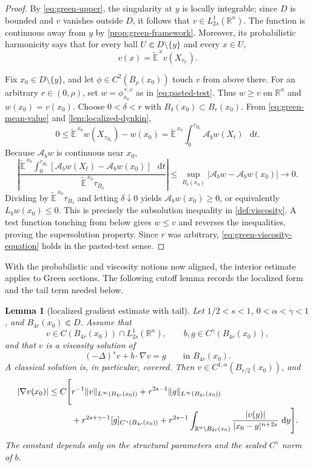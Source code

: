 \documentclass[10pt,a4paper]{amsart}
\numberwithin{equation}{section}
\newtheorem{lemma}[theorem]{Lemma}
\newcommand{\R}{\mathbb R}
\newcommand{\differential}{\mathop{}\!\mathrm d}
\newcommand{\rev}[1]{#1}
\begin{document}
\begin{proof}
By \eqref{eq:green-upper}, the singularity at $y$ is locally integrable;
since $D$ is bounded and $v$ vanishes outside $D$, it follows that
$v\in L^1_{2s}(\R^n)$.  The function is continuous away from $y$ by
\cref{prop:green-framework}.  Moreover, its probabilistic harmonicity says
that for every ball $U\Subset D\setminus\{y\}$ and every $x\in U$,
\begin{equation}\label{eq:green-mean-value}
 v(x)=\widetilde{\mathbb E}^{\,x}v(X_{\tau_U}).
\end{equation}

Fix $x_0\in D\setminus\{y\}$, and let $\phi\in C^2(B_\rho(x_0))$ touch
$v$ from above there.  For an arbitrary $r\in(0,\rho)$, set
$w=\phi^{\,r,v}_{x_0}$ as in \eqref{eq:pasted-test}.  Thus $w\ge v$ on
$\R^n$ and $w(x_0)=v(x_0)$.  Choose
$0<\delta<r$ with $\overline{B_\delta(x_0)}\subset B_r(x_0)$.  From
\eqref{eq:green-mean-value} and \cref{lem:localized-dynkin},
\[
 0\le \widetilde{\mathbb E}^{\,x_0}
       w(X_{\tau_{B_\delta}})-w(x_0)
 =\widetilde{\mathbb E}^{\,x_0}\int_0^{\tau_{B_\delta}}
       \mathcal A_bw(X_t)\,\differential t.
\]
Because $\mathcal A_bw$ is continuous near $x_0$,
\[
 \left|\frac{\widetilde{\mathbb E}^{\,x_0}
 \int_0^{\tau_{B_\delta}}
 [\mathcal A_bw(X_t)-\mathcal A_bw(x_0)]\,\differential t}
 {\widetilde{\mathbb E}^{\,x_0}\tau_{B_\delta}}\right|
 \le \sup_{B_\delta(x_0)}
 |\mathcal A_bw-\mathcal A_bw(x_0)|\longrightarrow0.
\]
Dividing by $\widetilde{\mathbb E}^{\,x_0}\tau_{B_\delta}$ and letting
$\delta\downarrow0$ yields $\mathcal A_bw(x_0)\ge0$, or equivalently
$L_bw(x_0)\le0$.  This is precisely the subsolution inequality in
\cref{def:viscosity}.  A test function touching from below gives
$w\le v$ and reverses the inequalities, proving the supersolution
property.  Since $r$ was arbitrary, \eqref{eq:green-viscosity-equation}
holds in the pasted-test sense.
\end{proof}
\endgroup

\rev{With the probabilistic and viscosity notions now aligned, the interior
estimate applies to Green sections.  The following cutoff lemma records the
localized form and the tail term needed below.}

\begin{lemma}[localized gradient estimate with tail]
\label{lem:localized-gradient-tail}
Let $1/2<s<1$, $0<\alpha<\gamma<1$, and
$B_{4r}(x_0)\Subset D$.  Assume that
\[
 v\in C(B_{4r}(x_0))\cap L^1_{2s}(\R^n),
 \qquad b,g\in C^\gamma(B_{4r}(x_0)),
\]
and that $v$ is a viscosity solution of
\[
 (-\Delta)^sv+b\cdot\nabla v=g
 \qquad\text{in }B_{4r}(x_0).
\]
A classical solution is, in particular, covered.  Then
$v\in C^{1,\alpha}(B_{r/2}(x_0))$, and
\begin{align}\label{eq:localized-gradient-tail}
 |\nabla v(x_0)|\le C\Bigg[&r^{-1}\|v\|_{L^\infty(B_{4r}(x_0))}
 +r^{2s-1}\|g\|_{L^\infty(B_{4r}(x_0))}\notag\\
 &+r^{2s+\gamma-1}[g]_{C^\gamma(B_{4r}(x_0))}
 +r^{2s-1}\int_{\R^n\setminus B_{2r}(x_0)}
 \frac{|v(y)|}{|x_0-y|^{n+2s}}\,\differential y\Bigg].
\end{align}
The constant depends only on the structural parameters and the scaled
$C^\gamma$ norm of $b$.
\end{lemma}
\end{document}
